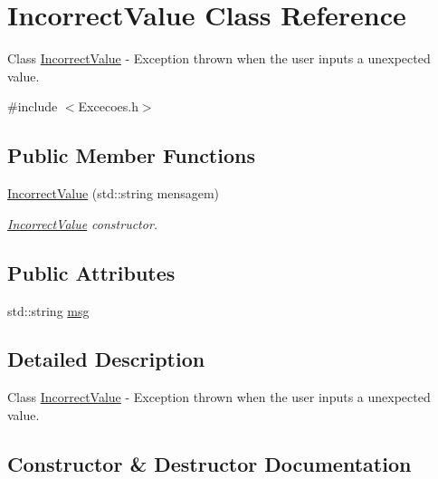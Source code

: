 \hypertarget{class_incorrect_value}{}\section{Incorrect\+Value Class Reference}
\label{class_incorrect_value}


Class \hyperlink{class_incorrect_value}{Incorrect\+Value} -\/ Exception thrown when the user inputs a unexpected value.  




{\ttfamily \#include $<$Excecoes.\+h$>$}

\subsection*{Public Member Functions}
\begin{DoxyCompactItemize}
\item 
\hyperlink{class_incorrect_value_a8c4c65c7899310a8f43e71540797cc4a}{Incorrect\+Value} (std\+::string mensagem)
\begin{DoxyCompactList}\small\item\em \hyperlink{class_incorrect_value}{Incorrect\+Value} constructor. \end{DoxyCompactList}\end{DoxyCompactItemize}
\subsection*{Public Attributes}
\begin{DoxyCompactItemize}
\item 
std\+::string \hyperlink{class_incorrect_value_a3738dbc1c48ca844d3f94a83c4d6dd01}{msg}
\end{DoxyCompactItemize}


\subsection{Detailed Description}
Class \hyperlink{class_incorrect_value}{Incorrect\+Value} -\/ Exception thrown when the user inputs a unexpected value. 

\subsection{Constructor \& Destructor Documentation}
\mbox{\label{class_incorrect_value_a8c4c65c7899310a8f43e71540797cc4a}} 
